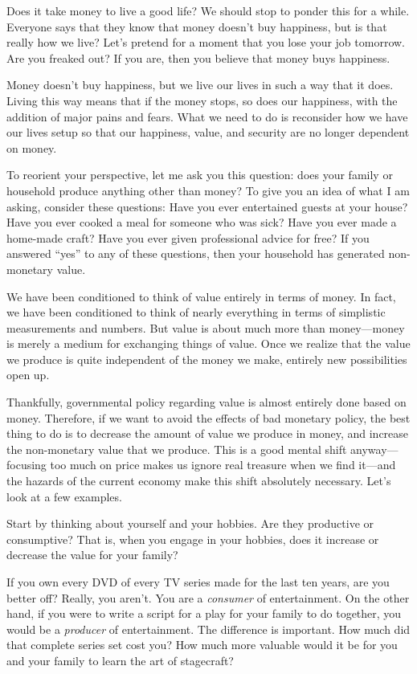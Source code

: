 Does it take money to live a good life?  We should stop to ponder this
for a while. Everyone says that they know that money doesn’t buy
happiness, but is that really how we live? Let’s pretend for a moment
that you lose your job tomorrow. Are you freaked out?  If you are, then
you believe that money buys happiness. 

Money doesn’t buy happiness, but we live our lives in such a way that
it does. Living this way means that if the money stops,
so does our happiness, with the addition of major pains and fears. 
What we need to do is reconsider how we have our lives setup so
that our happiness, value, and security are no longer dependent on money.

To reorient your perspective, let me ask you this question: does your
family or household produce anything other than money?  To give you an
idea of what I am asking, consider these questions: Have you ever
entertained guests at your house?  Have you ever cooked a meal for
someone who was sick?  Have you ever made a home-made craft?  Have you
ever given professional advice for free?  If you answered ``yes'' to any
of these questions, then your household has generated non-monetary
value. 

We have been conditioned to think of value entirely in terms of money.
In fact, we have been conditioned to think of nearly everything in
terms of simplistic measurements and numbers. But value is about much
more than money---money is merely a medium for exchanging things of
value. Once we realize that the value we produce is quite independent
of the money we make, entirely new possibilities open up.

Thankfully, governmental policy regarding value is almost entirely done
based on money. Therefore, if we want to avoid the effects of bad
monetary policy, the best thing to do is to decrease the amount of
value we produce in money, and increase the non-monetary value that we
produce. This is a good mental shift anyway---focusing too much on price
makes us ignore real treasure when we find it---and the hazards of the
current economy make this shift absolutely necessary.
Let’s look at a few examples. 

Start by thinking about yourself and your hobbies. Are they productive
or consumptive?  That is, when you engage in your hobbies, does it
increase or decrease the value for your family? 

If you own every DVD of every TV series made for the last ten years, are
you better off?  Really, you aren’t. You are a \textit{consumer} of
entertainment. On the other hand, if you were to write a script for a
play for your family to do together, you would be a \textit{producer}
of entertainment. The difference is important. How much did that
complete series set cost you?  How much more valuable would it be for
you and your family to learn the art of stagecraft? 

